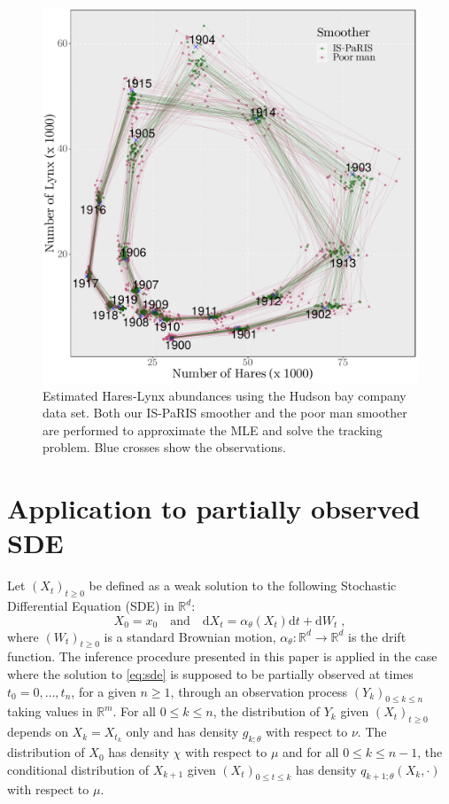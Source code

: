 \documentclass[12pt]{article}
\def\Xset{\mathbb{R}^d}
\newcommand{\md}[1]{g_{#1}}
\newcommand{\parvec}{\theta}
\newcommand{\hd}[1]{q_{#1}}
\newcommand{\rmd}{\ensuremath{\mathrm{d}}}
\newcommand{\eqsp}{\;}
\begin{document}
\begin{figure}
\begin{center}
\includegraphics[width = .45\textwidth]{Figure7.pdf}
\end{center}
\caption{\label{fig:LV:hares:lynx} Estimated Hares-Lynx abundances using the Hudson bay company data set. Both our IS-PaRIS smoother and the poor man smoother are performed to approximate the MLE and solve the tracking problem. Blue crosses show the observations.}
\end{figure} 





\appendix 

\section{Application to partially observed SDE}
\label{sec:filter:SDE}
Let $(X_t)_{t\ge 0}$ be defined as a weak solution to the following Stochastic Differential Equation (SDE) in $\mathbb{R}^d$:
\begin{equation}
\label{eq:sde}
X_0 = x_0 \quad\mbox{and}\quad \rmd X_t = \alpha_{\parvec}(X_t)\rmd t + \rmd W_t\eqsp,
\end{equation}
where $(W_t)_{t\geqslant 0}$ is a standard Brownian motion, $\alpha_{\parvec}: \Xset\to\Xset$ is the drift function. 
The inference procedure presented in this paper is applied in the case where the solution to \eqref{eq:sde} is supposed to be partially observed at times $t_0 = 0,\ldots,t_n$, for a given $n\geqslant 1$, through an observation process $(Y_k)_{0\leqslant k \leqslant n}$ taking values in $\mathbb{R}^m$. For all $0\leqslant k \leqslant n$, the distribution of $Y_k$ given $(X_t)_{t\geqslant 0}$ depends on $X_k = X_{t_k}$ only and has density $\md{k;\parvec}$ with respect to $\nu$. The distribution of $X_0$ has density $\chi$ with respect to $\mu$ and for all $0\leqslant k \leqslant n-1$, the conditional distribution of $X_{k+1} $ given $(X_{t})_{0\leqslant t\leqslant k}$ has density $\hd{k+1;\parvec}(X_{k},\cdot)$ with respect to $\mu$. 
\end{document}
